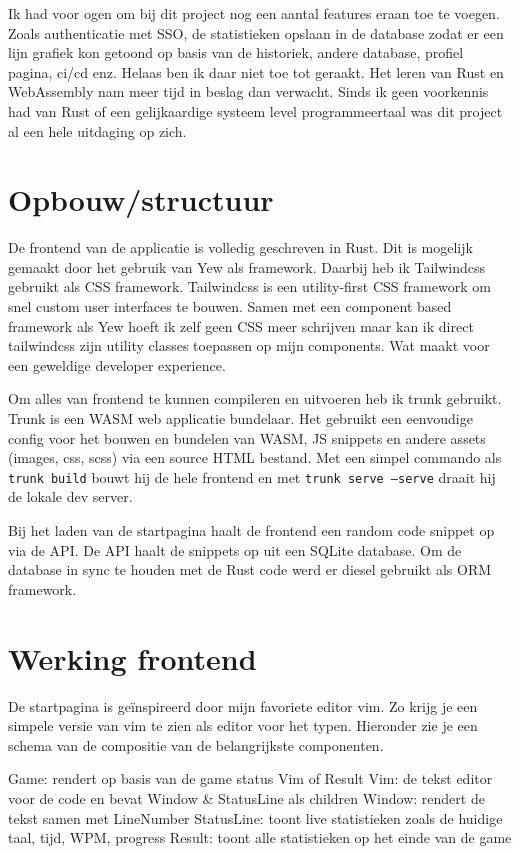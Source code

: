 Ik had voor ogen om bij dit project nog een aantal features eraan toe te voegen. Zoals authenticatie
met SSO, de statistieken opslaan in de database zodat er een lijn grafiek kon getoond op basis van
de historiek, andere database, profiel pagina, ci/cd enz. Helaas ben ik daar niet toe tot geraakt.
Het leren van Rust en WebAssembly nam meer tijd in beslag dan verwacht. Sinds ik geen voorkennis had
van Rust of een gelijkaardige systeem level programmeertaal was dit project al een hele uitdaging op
zich.

\section{Opbouw/structuur}

De frontend van de applicatie is volledig geschreven in Rust. Dit is mogelijk gemaakt door het
gebruik van Yew als framework. Daarbij heb ik Tailwindcss gebruikt als CSS framework. Tailwindcss is
een utility-first CSS framework om snel custom user interfaces te bouwen. Samen met een component
based framework als Yew hoeft ik zelf geen CSS meer schrijven maar kan ik direct tailwindcss zijn
utility classes toepassen op mijn components. Wat maakt voor een geweldige developer experience. 

Om alles van frontend te kunnen compileren en uitvoeren heb ik trunk gebruikt. Trunk is een WASM web
applicatie bundelaar. Het gebruikt een eenvoudige config voor het bouwen en bundelen van WASM, JS
snippets en andere assets (images, css, scss) via een source HTML bestand. Met een simpel commando
als \texttt{trunk build} bouwt hij de hele frontend en met \texttt{trunk serve
--serve} draait hij de lokale dev server.  

Bij het laden van de startpagina haalt de frontend een random code snippet op via de API. De API
haalt de snippets op uit een SQLite database. Om de database in sync te houden met de Rust code werd
er diesel gebruikt als ORM framework.


\section{Werking frontend}
De startpagina is geïnspireerd door mijn favoriete editor vim. Zo krijg je een simpele versie van
vim te zien als editor voor het typen. Hieronder zie je een schema van de compositie van de
belangrijkste componenten.

Game: rendert op basis van de game status Vim of Result 
Vim: de tekst editor voor de code en bevat Window \& StatusLine als children 
Window: rendert de tekst samen met LineNumber 
StatusLine: toont live statistieken zoals de huidige taal, tijd, WPM, progress 
Result: toont alle statistieken op het einde van de game

